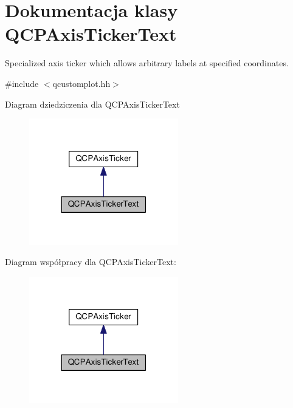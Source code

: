 \hypertarget{class_q_c_p_axis_ticker_text}{}\section{Dokumentacja klasy Q\+C\+P\+Axis\+Ticker\+Text}
\label{class_q_c_p_axis_ticker_text}


Specialized axis ticker which allows arbitrary labels at specified coordinates.  




{\ttfamily \#include $<$qcustomplot.\+hh$>$}



Diagram dziedziczenia dla Q\+C\+P\+Axis\+Ticker\+Text\nopagebreak
\begin{figure}[H]
\begin{center}
\leavevmode
\includegraphics[width=184pt]{class_q_c_p_axis_ticker_text__inherit__graph}
\end{center}
\end{figure}


Diagram współpracy dla Q\+C\+P\+Axis\+Ticker\+Text\+:\nopagebreak
\begin{figure}[H]
\begin{center}
\leavevmode
\includegraphics[width=184pt]{class_q_c_p_axis_ticker_text__coll__graph}
\end{center}
\end{figure}
